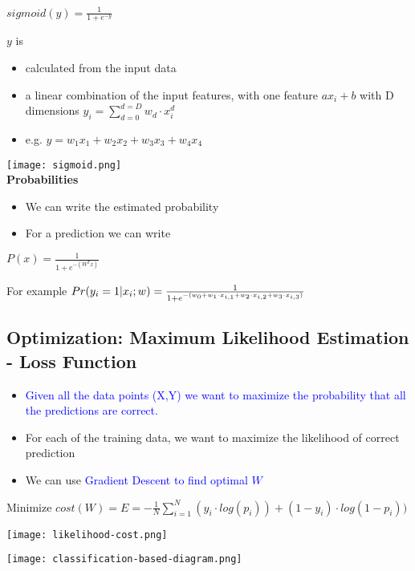 \begin{center}
    $sigmoid(y) = \frac{1}{1 + e^{-y}}$
\end{center}
$y$ is

\begin{itemize}
    \item calculated from the input data
    \item a linear combination of the input features, with one feature $ax_i + b$ with D dimensions $y_i=\sum_{d=0}^{d=D}w_d \cdot x_i^d$
    \item e.g. $y = w_1 x_1 + w_2 x_2 + w_3 x_3 + w_4 x_4$
\end{itemize}
\vspace{10pt}
\texttt{[image: sigmoid.png]} \\

\textbf{Probabilities}
\begin{itemize}
    \item We can write the estimated probability
    \item For a prediction we can write
\end{itemize}
\begin{center}
    $P(x) = \frac{1}{1 + e^{-(W^{T}x)}}$
\end{center}
\vspace{10pt}
\begin{center}
    For example $Pr(y_i = 1 | x_i; w) = \Large \frac {1}{1 + e^{-(w_0 + w_1 \cdot x_{i, 1} + w_2 \cdot x_{i, 2} + w_3 \cdot x_{i, 3})}}$
\end{center}

\subsection{Optimization: Maximum Likelihood Estimation - Loss Function}
\begin{itemize}
    \item \textcolor{blue}{Given all the data points (X,Y) we want to maximize the probability that all the predictions are correct.}
    \item For each of the training data, we want to maximize the likelihood of correct prediction
    \item We can use \textcolor{blue}{Gradient Descent to find optimal $W$}
\end{itemize}
\vspace{10pt}
\begin{center}
    Minimize $cost(W) = E = -\frac{1}{N}\sum_{i=1}^N (y_i \cdot log(p_i)) + (1 - y_i) \cdot log(1 - p_i))$
\end{center}
\vspace{10pt}
\texttt{[image: likelihood-cost.png]}

\texttt{[image: classification-based-diagram.png]}
